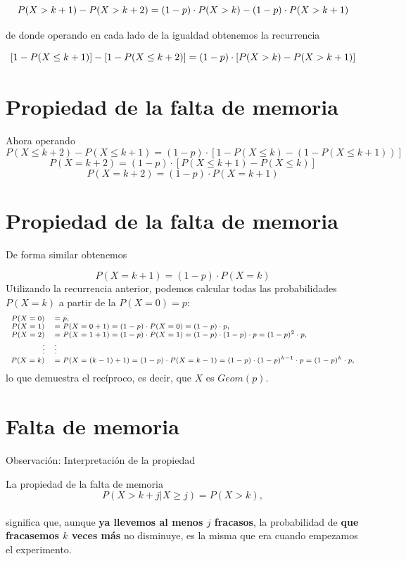 \documentclass[
  letterpaper,
  DIV=11,
  numbers=noendperiod]{scrreprt}
\begin{document}
\[
\scriptsize{P(X>k+1)-P(X>k+2)=(1-p)\cdot P(X>k)-(1-p)\cdot P(X>k+1)}
\]

de donde operando en cada lado de la igualdad obtenemos la recurrencia

\[
\scriptsize{[1-P(X\leq k+1)]-[1-P(X\leq k+2)]=(1-p)\cdot [P(X>k)-P(X>k+1)]}
\]

\section{Propiedad de la falta de
memoria}\label{propiedad-de-la-falta-de-memoria-4}

Ahora operando \[
P(X\leq k+2)-P(X\leq k+1)=(1-p)\cdot[1-P(X\leq k)-\left(1-P(X\leq k+1)\right)]
\] \[
P(X=k+2)=(1-p)\cdot[P(X\leq k+1)-P(X\leq k)]
\] \[
P(X=k+2)=(1-p)\cdot P(X=k+1)
\]

\section{Propiedad de la falta de
memoria}\label{propiedad-de-la-falta-de-memoria-5}

De forma similar obtenemos

\[
P(X=k+1)=(1-p)\cdot P(X=k)
\] Utilizando la recurrencia anterior, podemos calcular todas las
probabilidades \(P(X=k)\) a partir de la \(P(X=0)=p\): \[
\scriptsize{
\begin{array}{rl}
P(X=0)&= p,\\
P(X=1)&=P(X=0+1)= (1-p)\cdot P(X=0) =(1-p)\cdot  p,\\
P(X=2)&=P(X=1+1)= (1-p)\cdot P(X=1)=(1-p)\cdot (1-p)\cdot p=(1-p)^2\cdot p,\\
 \vdots &    \vdots \\
P(X=k)&=P(X=(k-1)+1)= (1-p)\cdot P(X=k-1)=(1-p)\cdot (1-p)^{k-1}\cdot p=(1-p)^{k}\cdot p,
\end{array}
}
\] lo que demuestra el recíproco, es decir, que \(X\) es \(Geom(p)\).

\section{Falta de memoria}\label{falta-de-memoria}

Observación: Interpretación de la propiedad

La propiedad de la falta de memoria \[
P(X> k+j\big|X \geq j)=P(X > k),
\]\\
significa que, aunque \textbf{ya llevemos al menos \(j\) fracasos}, la
probabilidad de \textbf{que fracasemos \(k\) veces más} no disminuye, es
la misma que era cuando empezamos el experimento.
\end{document}
